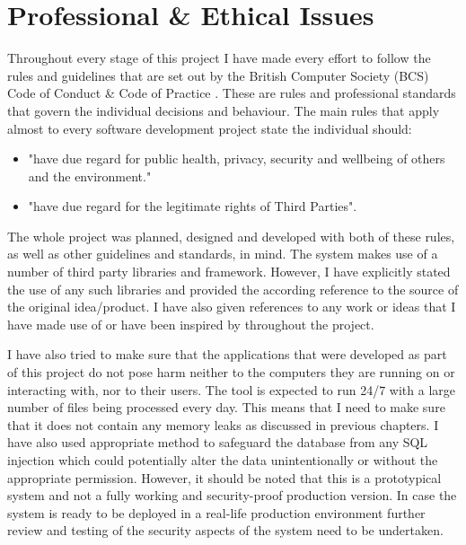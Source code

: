 \chapter{Professional \& Ethical Issues}
Throughout every stage of this project I have made every effort to follow the rules and guidelines that are set out by the British Computer Society (BCS) Code of Conduct \& Code of Practice \cite{bcsCodeOfConduct}. These are rules and professional standards that govern the individual decisions and behaviour. The main rules that apply almost to every software development project state the individual should:
\begin{itemize}
	\item "have due regard for public health, privacy, security and wellbeing of others and
the environment."\cite{bcsCodeOfConduct}
	\item "have due regard for the legitimate rights of Third Parties"\cite{bcsCodeOfConduct}.
\end{itemize}

The whole project was planned, designed and developed with both of these rules, as well as other guidelines and standards, in mind. The system makes use of a number of third party libraries and framework. However, I have explicitly stated the use of any such libraries and provided the according reference to the source of the original idea/product. I have also given references to any work or ideas that I have made use of or have been inspired by throughout the project.

I have also tried to make sure that the applications that were developed as part of this project do not pose harm neither to the computers they are running on or interacting with, nor to their users. The tool is expected to run 24/7 with a large number of files being processed every day. This means that I need to make sure that it does not contain any memory leaks as discussed in previous chapters. I have also used appropriate method to safeguard the database from any SQL injection \cite{Su2006} which could potentially alter the data unintentionally or without the appropriate permission. However, it should be noted that this is a prototypical system and not a fully working and security-proof production version. In case the system is ready to be deployed in a real-life production environment further review and testing of the security aspects of the system need to be undertaken.


